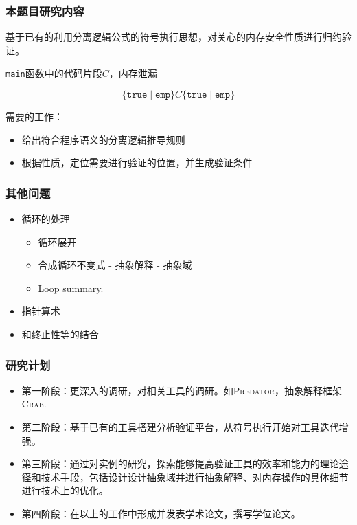 \documentclass[aspectratio=1610, 11pt]{beamer}
\begin{document}
\begin{frame}\frametitle{本题目研究内容}
基于已有的利用分离逻辑公式的符号执行思想，对关心的内存安全性质进行归约验证。
\begin{example}
\texttt{main}函数中的代码片段$C$，内存泄漏

\[\{\texttt{true}\mid \texttt{emp}\} C \{\texttt{true}\mid \texttt{emp}\}\]
\end{example}
需要的工作：
\begin{itemize}
\item 给出符合程序语义的分离逻辑推导规则
\item 根据性质，定位需要进行验证的位置，并生成验证条件
\end{itemize}
\end{frame}


\begin{frame}\frametitle{其他问题}
\begin{itemize}
\item 循环的处理
\begin{itemize}
\item 循环展开
\item 合成循环不变式 - 抽象解释 - 抽象域
\item Loop summary.
\end{itemize}
\item 指针算术
\item 和终止性等的结合
\end{itemize}
\end{frame}

\begin{frame}\frametitle{研究计划}
\begin{itemize}
\item 第一阶段：更深入的调研，对相关工具的调研。如\textsc{Predator}，抽象解释框架\textsc{Crab}.

\item 第二阶段：基于已有的工具搭建分析验证平台，从符号执行开始对工具迭代增强。

\item 第三阶段：通过对实例的研究，探索能够提高验证工具的效率和能力的理论途径和技术手段，包括设计设计抽象域并进行抽象解释、对内存操作的具体细节进行技术上的优化。

\item 第四阶段：在以上的工作中形成并发表学术论文，撰写学位论文。
\end{itemize}
\end{frame}
\end{document}
